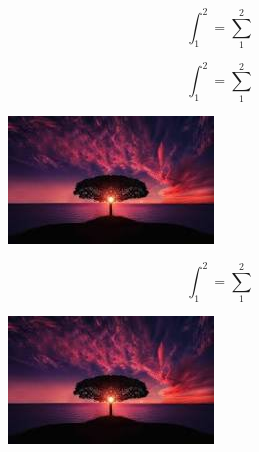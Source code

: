 \textsf{}\documentclass{beamer}
\begin{document}
\begin{frame}
	\begin{equation}\label{key}
		\int_{1}^{2}=\sum_{1}^{2}
	\end{equation}
\end{frame}
\begin{frame}
	\begin{equation}\label{key}
		\int_{1}^{2}=\sum_{1}^{2}
	\end{equation}
\begin{figure}
	\centering
	\includegraphics[width=0.7\linewidth]{screenshot003}
	\caption{}
	\label{fig:screenshot003}
\end{figure}
\end{frame}
\begin{frame}
	\begin{equation}\label{key}
		\int_{1}^{2}=\sum_{1}^{2}
	\end{equation}
\begin{figure}
	\centering
	\includegraphics[width=0.7\linewidth]{screenshot002}
	\caption{}
	\label{fig:screenshot002}
\end{figure}

\end{frame}
\end{document}
